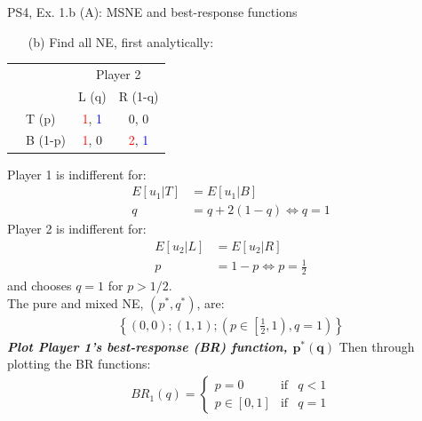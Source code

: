 \begin{frame}{PS4, Ex. 1.b (A): MSNE and best-response functions}
  \begin{multicols}{2}
    \begin{itemize}
      \item[(b)] Find all NE, first analytically:
    \end{itemize}
    \begin{table}
      \begin{tabular}{cl|c|c|}
        & \multicolumn{1}{c}{} & \multicolumn{2}{c}{\color{blue}Player 2}\\
        \parbox[t]{1mm}{}
        &  &  &  \\
        & T (p) & \textcolor{red}{1}, \textcolor{blue}{1} & 0, 0 \\
        & B (1-p) & \textcolor{red}{1}, 0 & \textcolor{red}{2}, \textcolor{blue}{1} \\
      \end{tabular}
    \end{table}
    Player 1 is indifferent for:
    \begin{align*}
      E[u_1|T]&=E[u_1|B]\\
      q &= q + 2(1-q) \Leftrightarrow q = 1
    \end{align*}
    Player 2 is indifferent for:
    \begin{align*}
      E[u_2|L]&=E[u_2|R]\\
      p &= 1-p \Leftrightarrow p = \frac{1}{2}
    \end{align*}
    and chooses $q=1$ for $p>1/2$.\\\medskip
    The pure and mixed NE, $(p^{*},q^{*})$, are:
    \begin{align*}
      \left\{(0,0);(1,1);\left(p\in\left[\frac{1}{2},1\right),q=1\right)\right\}
    \end{align*}
    \textbf{\textit{Plot Player 1's best-response (BR) function, $\bm{p^{*}(q)}$}}
  \vfill\null \columnbreak
    Then through plotting the BR functions:
    \vspace{-8pt}
    \begin{align*}
      BR_1(q)=\left\{ \begin{array}{lcl}
          p=0       & \text{if} & q<1 \\
          p\in[0,1] & \text{if} & q=1
      \end{array}\right.

\end{align*}
\end{multicols}
\end{frame}
